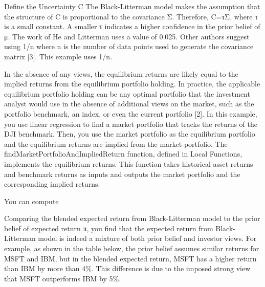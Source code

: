 %

Define the Uncertainty C
The Black-Litterman model makes the assumption that the structure of C is proportional to the covariance Σ. Therefore, C=τΣ, where τ is a small constant. A smaller τ indicates a higher confidence in the prior belief of μ. The work of He and Litterman uses a value of 0.025. Other authors suggest using 1/n where n is the number of data points used to generate the covariance matrix [3]. This example uses 1/n.
%

In the absence of any views, the equilibrium returns are likely equal to the implied returns from the equilibrium portfolio holding. In practice, the applicable equilibrium portfolio holding can be any optimal portfolio that the investment analyst would use in the absence of additional views on the market, such as the portfolio benchmark, an index, or even the current portfolio [2]. In this example, you use linear regression to find a market portfolio that tracks the returns of the DJI benchmark. Then, you use the market portfolio as the equilibrium portfolio and the equilibrium returns are implied from the market portfolio. The findMarketPortfolioAndImpliedReturn function, defined in Local Functions, implements the equilibrium returns. This function takes historical asset returns and benchmark returns as inputs and outputs the market portfolio and the corresponding implied returns.

%
You can compute 
%
%

Comparing the blended expected return from Black-Litterman model to the prior belief of expected return π, you find that the expected return from Black-Litterman model is indeed a mixture of both prior belief and investor views. For example, as shown in the table below, the prior belief assumes similar returns for MSFT and IBM, but in the blended expected return, MSFT has a higher return than IBM by more than 4\%. This difference is due to the imposed strong view that MSFT outperforms IBM by 5\%.

